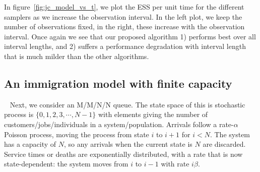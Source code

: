 {In figure~\ref{fig:jc_model_vs_t}, we plot the ESS per unit time for the
different samplers as we increase the observation interval. In the left plot,
we keep the number of observations fixed, in the right, these increase with
the observation interval. Once again we see that our proposed algorithm
1) performs best over all interval lengths, and 2) suffers a performance
degradation with interval length that is much milder than the other algorithms.

  \vspace{-.25in}
\subsection{An immigration model with finite capacity}\label{sec:immig}~
Next, we consider an M/M/N/N queue. The state space of this is stochastic 
process is $\{0, 1, 2, 3, \cdots, N - 1\}$ with 
elements giving the number of customers/jobs/individuals in a system/population. 
Arrivals follow a rate-$\alpha$ Poisson process, moving the process from state 
$i$ to $i+1$ for $i<N$. The system has a capacity of $N$, so any arrivals when 
the current state is $N$ are discarded.  Service times or deaths are 
exponentially distributed, with a rate that is now state-dependent:
the system moves from $i$ to $i - 1$ with rate $i\beta$. 

}
